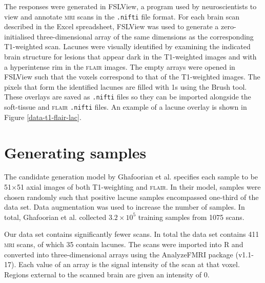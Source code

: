 The responses were generated in FSLView, a program used by neuroscientists to view and annotate \textsc{mri} scans in the \texttt{.nifti} file format. For each brain scan described in the Excel spreadsheet, FSLView was used to generate a zero-initialised three-dimensional array of the same dimensions as the corresponding T1-weighted scan. Lacunes were visually identified by examining the indicated brain structure for lesions that appear dark in the T1-weighted images and with a hyperintense rim in the \textsc{flair} images. The empty arrays were opened in FSLView such that the voxels correspond to that of the T1-weighted images. The pixels that form the identified lacunes are filled with 1s using the Brush tool. These overlays are saved as \texttt{.nifti} files so they can be imported alongside the soft-tissue and \textsc{flair} \texttt{.nifti} files. An example of a lacune overlay is shown in Figure \ref{data-t1-flair-lac}.




\section{Generating samples}\label{data-samples}

The candidate generation model by Ghafoorian et al. \cite{GhafoorianM.2017Dml3} specifies each sample to be 51$\times$51 axial images of both T1-weighting and \textsc{flair}. In their model, samples were chosen randomly such that positive lacune samples encompassed one-third of the data set. Data augmentation was used to increase the number of samples. In total, Ghafoorian et al. collected $3.2\times10^5$ training samples from 1075 scans.

Our data set contains significantly fewer scans. In total the data set contains 411 \textsc{mri} scans, of which 35 contain lacunes. The scans were imported into R and converted into three-dimensional arrays using the AnalyzeFMRI package (v1.1-17). Each value of an array is the signal intensity of the scan at that voxel. Regions external to the scanned brain are given an intensity of 0.

